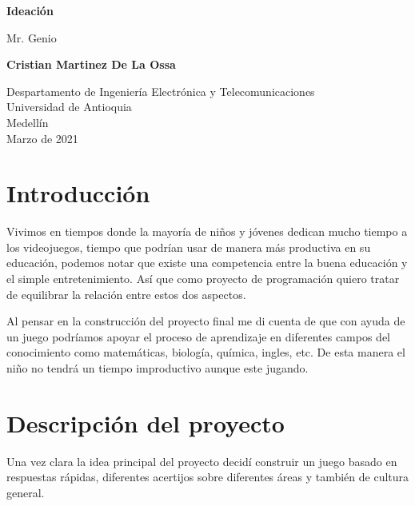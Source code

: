 \documentclass{article}
\begin{document}
\begin{titlepage}
    \begin{center}
        \vspace*{1cm}
            
        \Huge
        \textbf{Ideación}
            
        \vspace{0.5cm}
        \LARGE
        Mr. Genio
            
        \vspace{1.5cm}
            
        \text
        
        
        \textbf{Cristian Martinez De La Ossa}
        
            
        \vfill
            
        \vspace{0.8cm}
            
        \Large
        Despartamento de Ingeniería Electrónica y Telecomunicaciones\\
        Universidad de Antioquia\\
        Medellín\\
        Marzo de 2021
            
    \end{center}
\end{titlepage}

\tableofcontents
\newpage
\section{Introducción}\label{intro}
Vivimos en tiempos donde la mayoría de niños y jóvenes dedican mucho tiempo a los videojuegos, tiempo que podrían usar de manera más productiva en su educación, podemos notar que existe una competencia entre la buena educación y el simple entretenimiento. Así que como proyecto de programación quiero tratar de equilibrar la relación entre estos dos aspectos.

Al pensar en la construcción del proyecto final me di cuenta de que con ayuda de un juego podríamos apoyar el proceso de aprendizaje en diferentes campos del conocimiento como matemáticas, biología, química, ingles, etc. De esta manera el niño no tendrá un tiempo improductivo aunque este jugando.

\section{Descripción del proyecto} \label{contenido}
Una vez clara la idea principal del proyecto decidí construir un juego basado en respuestas rápidas,  diferentes acertijos sobre diferentes áreas y también de cultura general.
\end{document}
